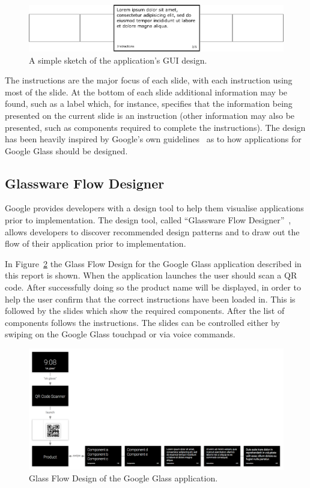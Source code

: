 	\begin{figure}[ht!]
		\centering
		\includegraphics[width=150mm]{images/cardDesign2}
		\caption{A simple sketch of the application's GUI design.}
		\label{cardDesign}
	\end{figure}

The instructions are the major focus of each slide, with each instruction using most of the slide. At the bottom of each slide additional information may be found, such as a label which, for instance, specifies that the information being presented on the current slide is an instruction (other information may also be presented, such as components required to complete the instructions). The design has been heavily inspired by Google's own guidelines~\cite{glassDesignPrinciples} as to how applications for Google Glass should be designed.

\subsection{Glassware Flow Designer}
Google provides developers with a design tool to help them visualise applications prior to implementation. The design tool, called ``Glassware Flow Designer''~\cite{glasswareFlowDesigner}, allows developers to discover recommended design patterns and to draw out the flow of their application prior to implementation.

In Figure~\ref{glassFlowDesign} the Glass Flow Design for the Google Glass application described in this report is shown. When the application launches the user should scan a QR code. After successfully doing so the product name will be displayed, in order to help the user confirm that the correct instructions have been loaded in. This is followed by the slides which show the required components. After the list of components follows the instructions. The slides can be controlled either by swiping on the Google Glass touchpad or via voice commands.

	\begin{figure}[ht!]
		\centering
		\includegraphics[width=150mm]{images/glaswareFlowDesignerScreenshot}
		\caption{Glass Flow Design of the Google Glass application.}
		\label{glassFlowDesign}
	\end{figure}